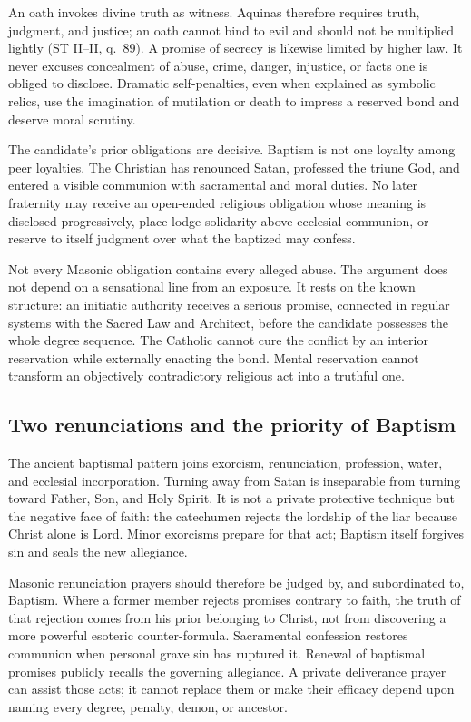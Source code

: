 An oath invokes divine truth as witness. Aquinas therefore requires truth, judgment, and justice; an oath cannot bind to evil and should not be multiplied lightly (ST II--II, q.~89). A promise of secrecy is likewise limited by higher law. It never excuses concealment of abuse, crime, danger, injustice, or facts one is obliged to disclose. Dramatic self-penalties, even when explained as symbolic relics, use the imagination of mutilation or death to impress a reserved bond and deserve moral scrutiny.

The candidate's prior obligations are decisive. Baptism is not one loyalty among peer loyalties. The Christian has renounced Satan, professed the triune God, and entered a visible communion with sacramental and moral duties. No later fraternity may receive an open-ended religious obligation whose meaning is disclosed progressively, place lodge solidarity above ecclesial communion, or reserve to itself judgment over what the baptized may confess.

Not every Masonic obligation contains every alleged abuse. The argument does not depend on a sensational line from an exposure. It rests on the known structure: an initiatic authority receives a serious promise, connected in regular systems with the Sacred Law and Architect, before the candidate possesses the whole degree sequence. The Catholic cannot cure the conflict by an interior reservation while externally enacting the bond. Mental reservation cannot transform an objectively contradictory religious act into a truthful one.

\subsection{Two renunciations and the priority of Baptism}

The ancient baptismal pattern joins exorcism, renunciation, profession, water, and ecclesial incorporation. Turning away from Satan is inseparable from turning toward Father, Son, and Holy Spirit. It is not a private protective technique but the negative face of faith: the catechumen rejects the lordship of the liar because Christ alone is Lord. Minor exorcisms prepare for that act; Baptism itself forgives sin and seals the new allegiance.

Masonic renunciation prayers should therefore be judged by, and subordinated to, Baptism. Where a former member rejects promises contrary to faith, the truth of that rejection comes from his prior belonging to Christ, not from discovering a more powerful esoteric counter-formula. Sacramental confession restores communion when personal grave sin has ruptured it. Renewal of baptismal promises publicly recalls the governing allegiance. A private deliverance prayer can assist those acts; it cannot replace them or make their efficacy depend upon naming every degree, penalty, demon, or ancestor.

